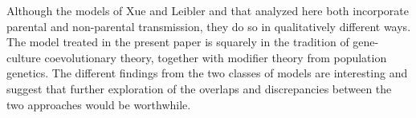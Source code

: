 \documentclass[9pt,twocolumn,twoside,lineno]{pnas-new}
\begin{document}
 Although the models of Xue and Leibler \cite{xue2016evolutionary} and that analyzed here both incorporate parental and non-parental transmission, they do so in qualitatively different ways. The model treated in the present paper is squarely in the tradition of gene-culture coevolutionary theory, together with modifier theory from population genetics. The different findings from the two classes of models are interesting and suggest that further exploration of the overlaps and discrepancies between the two approaches would be worthwhile.
 





 






\end{document}
